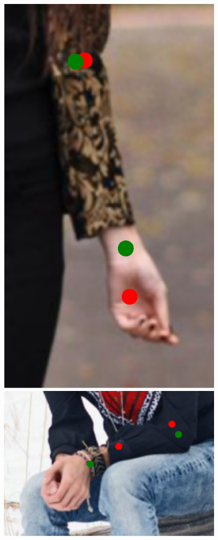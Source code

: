 \begin{figure}[!t]
    \includegraphics[height=\fh]{resources/Fixing/fix_15}
    \includegraphics[height=\fh]{resources/Fixing/fix_17}

\end{figure}
